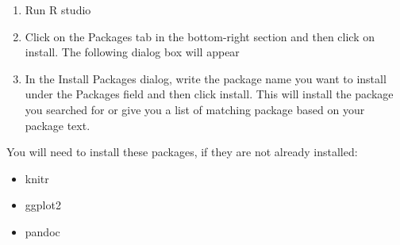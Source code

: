 \documentclass{article}
\begin{document}
\begin{enumerate}
    \item Run R studio
    \item Click on the Packages tab in the bottom-right section and then click on install. The following dialog box will appear
    \item In the Install Packages dialog, write the package name you want to install under the Packages field and then click install. This will install the package you searched for or give you a list of matching package based on your package text.
\end{enumerate}

You will need to install these packages, if they are not already installed:
\begin{itemize}
    \item knitr
    \item ggplot2
    \item pandoc
\end{itemize}
\end{document}
